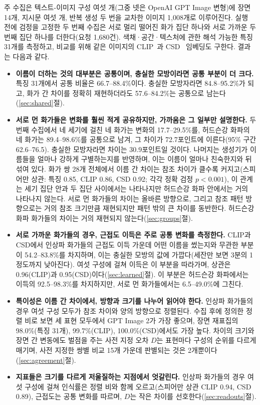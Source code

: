 \documentclass[10pt]{article}
\begin{document}
주 수집은 텍스트-이미지 구성 여섯 개(그중 넷은 OpenAI GPT Image 변형)에 장면 14개, 지시문 여섯 개,
반복 생성 두 번을 교차한 이미지 1,008개로 이루어진다. 실행 전에 검정을 고정한 두 번째 수집은 서로 멀리
떨어진 화가 집단 하나와 서로 가까운 두 번째 집단 하나를 더한다(요청 1,680건). 색채·공간·텍스처에 관한
해석 가능한 특징 31개를 측정하고, 비교를 위해 같은 이미지의 CLIP~\citep{radford2021}과
CSD~\citep{somepalli2024style} 임베딩도 구한다. 결과는 다음과 같다.
\begin{itemize}
\item \textbf{이름이 더하는 것의 대부분은 공통이며, 충실한 모방이라면 공통 부분이 더 크다.} 특징
31개에서 공통 비율은 66.7--88.4\%이다. 충실한 모방자라면 84.8--95.2\%가 되고, 화가 간 차이를 정확히
재현하더라도 57.6--84.2\%는 공통으로 남는다(\ref{sec:shared}절).
\item \textbf{서로 먼 화가들은 변화를 훨씬 적게 공유하지만, 가까움은 그 일부만 설명한다.} 두 번째
수집에서 네 세기에 걸친 네 화가는 변화의 17.7--29.5\%를, 허드슨강 화파의 네 화가는 89.4--98.6\%를
공통으로 남겨, 그 차이가 72.7포인트에 이른다(95\% 구간 62.6--76.5). 충실한 모방자라면 차이는
30.9포인트일 것이다. 나머지는 생성기가 이름들을 얼마나 강하게 구별하는지를 반영하며, 이는 이름이 얼마나
친숙한지와 뒤섞여 있다. 화가 쌍 28개 전체에서 이름 간 차이는 참조 차이가 클수록 커지고(스피어만 상관:
특징 0.85, CLIP 0.86, CSD 0.92; 각각 정확 검정 $p<0.001$), 이 관계는 세기 집단 안과 두 집단 사이에서는
나타나지만 허드슨강 화파 안에서는 거의 나타나지 않는다. 서로 먼 화가들의 차이는 올바른 방향으로, 그리고
참조 패턴 방향으로는 거의 참조 크기만큼 재현되지만 패턴 밖의 큰 차이를 동반한다. 허드슨강 화파 화가들의
차이는 거의 재현되지 않는다(\ref{sec:groups}절).
\item \textbf{서로 가까운 화가들의 경우, 근접도 이득은 주로 공통 변화를 측정한다.} CLIP과 CSD에서
인상파 화가들의 근접도 이득 가운데 어떤 이름을 썼는지와 무관한 부분이 54.2--83.8\%를 차지하며, 이는
충실한 모방의 값에 가깝다(세잔만 보면 3분의 1 정도까지 낮아진다). 여섯 구성에 걸쳐 이득은 이 부분을
따라가며, 상관은 0.96(CLIP)과 0.95(CSD)이다(\ref{sec:learned}절). 이 부분은 허드슨강 화파에서는 이득의
92.5--98.3\%를 차지하지만, 서로 먼 화가들에서는 6.5--49.0\%에 그친다.
\item \textbf{특이성은 이름 간 차이에서, 방향과 크기를 나누어 읽어야 한다.} 인상파 화가들의 경우 여섯
구성 모두가 참조 차이와 양의 방향으로 정렬된다. 수집 후에 정의한 정렬 비로 보면 세 표현 모두에서 GPT
Image 2가 가장 좋으며, 장면 재표집의 98.0\%(특징 31개), 99.7\%(CLIP), 100.0\%(CSD)에서도 가장
높다. 차이의
크기와 장면 간 변동에도 벌점을 주는 사전 지정 오차 $D$는 표현마다 구성의 순위를 다르게 매기며, 사전
지정한 쌍별 비교 15개 가운데 판별되는 것은 2개뿐이다(\ref{sec:agreement}절).
\item \textbf{지표들은 크기를 다르게 저울질하는 지점에서 엇갈린다.} 인상파 화가들의 경우 여섯 구성에 걸쳐
인식률은 정렬 비와 함께 오르고(스피어만 상관 CLIP 0.94, CSD 0.89), 근접도는 공통 변화를 따르며, $D$는
작은 차이를 선호한다(\ref{sec:readouts}절).
\end{itemize}
\end{document}
